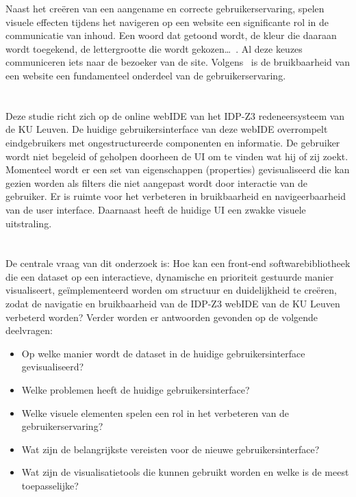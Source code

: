 Naast het creëren van een aangename en correcte gebruikerservaring, spelen visuele effecten tijdens het navigeren op een website een significante rol in de communicatie van inhoud. Een woord dat getoond wordt, de kleur die daaraan wordt toegekend, de lettergrootte die wordt gekozen…~\autocite{Bordbar2016}. Al deze keuzes communiceren iets naar de bezoeker van de site. Volgens~\textcite{Lee2012} is de bruikbaarheid van een website een fundamenteel onderdeel van de gebruikerservaring.

\section{}%
\label{sec:probleemstelling}
Deze studie richt zich op de online webIDE van het IDP-Z3 redeneersysteem van de KU Leuven. De huidige gebruikersinterface van deze webIDE overrompelt eindgebruikers met ongestructureerde componenten en informatie. De gebruiker wordt niet begeleid of geholpen doorheen de UI om te vinden wat hij of zij zoekt. Momenteel wordt er een set van eigenschappen (properties) gevisualiseerd die kan gezien worden als filters die niet aangepast wordt door interactie van de gebruiker. Er is ruimte voor het verbeteren in bruikbaarheid en navigeerbaarheid van de user interface. Daarnaast heeft de huidige UI een zwakke visuele uitstraling.

\section{}%
\label{sec:onderzoeksvraag}
De centrale vraag van dit onderzoek is: Hoe kan een front-end softwarebibliotheek die een dataset op een interactieve, dynamische en prioriteit gestuurde manier visualiseert, geïmplementeerd worden om structuur en duidelijkheid te creëren, zodat de navigatie en bruikbaarheid van de IDP-Z3 webIDE van de KU Leuven verbeterd worden? Verder worden er antwoorden gevonden op de volgende deelvragen:
\begin{itemize}
    \item Op welke manier wordt de dataset in de huidige gebruikersinterface gevisualiseerd?
    \item Welke problemen heeft de huidige gebruikersinterface?
    \item Welke visuele elementen spelen een rol in het verbeteren van de gebruikerservaring?
    \item Wat zijn de belangrijkste vereisten voor de nieuwe gebruikersinterface?
    \item Wat zijn de visualisatietools die kunnen gebruikt worden en welke is de meest toepasselijke?
\end{itemize}

